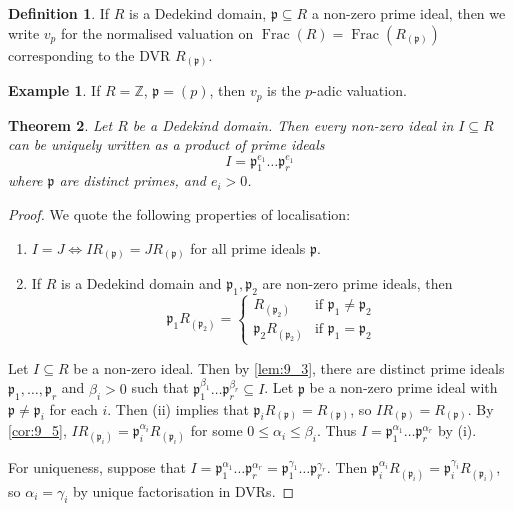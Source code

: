 \documentclass[11pt]{article}
\theoremstyle{definition}
\newtheorem{definition}{Definition}[subsection]
\newtheorem*{example}{Example}
\theoremstyle{plain}
\newtheorem{theorem}[definition]{Theorem}
\theoremstyle{remark}
\DeclareMathOperator{\Frac}{Frac}
\newcommand{\bZ}{\mathbb{Z}}
\newcommand{\fp}{\mathfrak{p}}
\begin{document}
\begin{definition}
    If $R$ is a Dedekind domain, $\fp \subseteq R$ a non-zero prime ideal, then we write $v_p$ for the normalised valuation on $\Frac(R) = \Frac(R_{(\fp)})$ corresponding to the DVR $R_{(\fp)}$.
\end{definition}

\begin{example}
    If $R = \bZ$, $\fp = (p)$, then $v_p$ is the $p$-adic valuation.
\end{example}

\begin{theorem}\label{thm:9_7}
    Let $R$ be a Dedekind domain. Then every non-zero ideal in $I \subseteq R$ can be uniquely written as a product of prime ideals
    \begin{equation*}
        I = \fp_1^{e_1} \ldots \fp_r^{e_1}
    \end{equation*}
    where $\fp$ are distinct primes, and $e_i > 0$.
\end{theorem}
\begin{proof}
    We quote the following properties of localisation:
    \begin{enumerate}
        \item $I = J \iff I R_{(\fp)} = J R_{(\fp)}$ for all prime ideals $\fp$.
        \item If $R$ is a Dedekind domain and $\fp_1, \fp_2$ are non-zero prime ideals, then
            \begin{equation*}
                \fp_1 R_{(\fp_2)} =
                \begin{cases}
                    R_{(\fp_2)} &\text{if } \fp_1 \neq \fp_2\\
                    \fp_2 R_{(\fp_2)} &\text{if } \fp_1 = \fp_2
                \end{cases}
            \end{equation*}
    \end{enumerate}

    Let $I \subseteq R$ be a non-zero ideal. Then by \autoref{lem:9_3}, there are distinct prime ideals $\fp_1, \ldots, \fp_r$ and $\beta_i > 0$ such that $\fp_1^{\beta_1} \ldots \fp_r^{\beta_r} \subseteq I$. Let $\fp$ be a non-zero prime ideal with $\fp \neq \fp_i$ for each $i$. Then (ii) implies that $\fp_i R_{(\fp)} = R_{(\fp)}$, so $I R_{(\fp)} = R_{(\fp)}$. By \autoref{cor:9_5}, $I R_{(\fp_i)} = \fp_i^{\alpha_i} R_{(\fp_i)}$ for some $0 \le \alpha_i \le \beta_i$. Thus $I = \fp_1^{\alpha_1} \ldots \fp_r^{\alpha_r}$ by (i).

    For uniqueness, suppose that $I = \fp_1^{\alpha_1} \ldots \fp_r^{\alpha_r} = \fp_1^{\gamma_1} \ldots \fp_r^{\gamma_r}$. Then $\fp_i^{\alpha_i} R_{(\fp_i)} = \fp_i^{\gamma_i} R_{(\fp_i)}$, so $\alpha_i = \gamma_i$ by unique factorisation in DVRs.
\end{proof}
\end{document}
